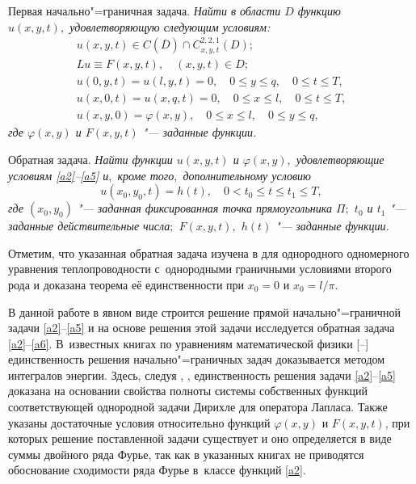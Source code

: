 \smallskip

{\small\sc Первая начально"=граничная задача.}
\it  Найти в области $D$ функцию \\ $u(x,y,t),$ удовлетворяющую следующим условиям\/{\rm:}
\begin{gather}\label{a2}
u(x,y,t)\in C(\overline{D})\cap C_{x,y,t}^{2, 2, 1}(D);
\\
\label{a4}
Lu\equiv F(x,y,t),\quad  (x,y,t)\in D;
\\
\label{a4}
u(0, y, t)=u(l,y,t)=0,\quad  0\leqslant y\leqslant q,\quad 0\leqslant t \leqslant T,
\\
\label{a41}
u(x, 0, t)=u(x,q,t)=0,\quad  0\leqslant x\leqslant l,\quad 0\leqslant t \leqslant T,
\\
\label{a5}
u(x,y, 0)=\varphi(x,y),\quad 0\leqslant x\leqslant l,\quad  0\leqslant y\leqslant q,
\end{gather}
где $\varphi(x,y)$ и $F(x,y,t)$ "--- заданные функции\rm.


\smallskip

{\small\sc Обратная задача.} \it Найти функции
$u(x,y,t)$ и $\varphi(x,y),$ удовлетворяющие условиям \eqref{a2}--\eqref{a5} и$,$ кроме того$,$ дополнительному условию
\begin{equation}\label{a6}
u(x_0,y_0, t)=h(t),\quad  0<t_0\leqslant t \leqslant t_1\leqslant T,
\end{equation}
где $(x_0,y_0)$ "--- заданная фиксированная точка прямоугольника $\Pi;$ $t_0$ и $t_1$ "--- заданные действительные числа$;$ $F(x,y,t),$ $h(t)$ "--- заданные функции\rm.

\smallskip


Отметим, что указанная обратная задача изучена в \cite[с.~119]{zayn:1} для однородного одномерного уравнения теплопроводности с~однородными граничными условиями второго рода и доказана теорема её единственности при $x_0=0$ и $x_0=l/\pi$.

В данной работе в явном виде строится решение прямой начально"=граничной задачи \eqref{a2}--\eqref{a5} %
и на основе решения этой задачи исследуется обратная задача \eqref{a2}--\eqref{a6}. %
В~известных книгах по уравнениям математической физики  \mbox{[--]} единственность решения начально"=граничных задач доказывается методом интегралов энергии. 
Здесь, следуя \cite[c.~111]{zayn:7}, \cite{zayn:8},   единственность решения задачи \eqref{a2}--\eqref{a5} доказана на основании свойства полноты системы собственных функций соответствующей однородной задачи Дирихле для оператора Лапласа. 
Также указаны достаточные условия относительно функций $\varphi(x,y)$ и $F(x,y,t)$, при которых решение поставленной задачи существует и оно определяется в виде суммы двойного ряда Фурье, так как в указанных книгах не приводятся обоснование сходимости ряда Фурье в~классе функций \eqref{a2}.

